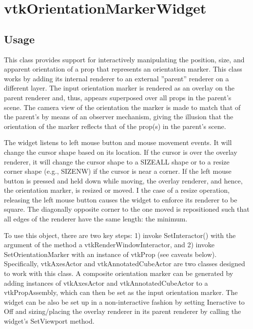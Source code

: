 \section{vtkOrientationMarkerWidget}

\subsection{Usage}

 This class provides support for interactively manipulating the position,
 size, and apparent orientation of a prop that represents an orientation
 marker.  This class works by adding its internal renderer to an external
 ''parent'' renderer on a different layer.  The input orientation marker is
 rendered as an overlay on the parent renderer and, thus, appears superposed
 over all props in the parent's scene.  The camera view of the orientation
 the marker is made to match that of the parent's by means of an observer
 mechanism, giving the illusion that the orientation of the marker reflects
 that of the prop(s) in the parent's scene.

 The widget listens to left mouse button and mouse movement events. It will
 change the cursor shape based on its location. If the cursor is over the
 overlay renderer, it will change the cursor shape to a SIZEALL shape
 or to a resize corner shape (e.g., SIZENW) if the cursor is near a corner.
 If the left mouse button is pressed and held down while moving, the overlay
 renderer, and hence, the orientation marker, is resized or moved.  I the case
 of a resize operation, releasing the left mouse button causes the widget
 to enforce its renderer to be square.  The diagonally opposite corner to the
 one moved is repositioned such that all edges of the renderer have the same
 length: the minimum.

 To use this object, there are two key steps: 1) invoke SetInteractor() with
 the argument of the method a vtkRenderWindowInteractor, and 2) invoke
 SetOrientationMarker with an instance of vtkProp (see caveats below).
 Specifically, vtkAxesActor and vtkAnnotatedCubeActor are two classes
 designed to work with this class.  A composite orientation marker can be
 generated by adding instances of vtkAxesActor and vtkAnnotatedCubeActor to a
 vtkPropAssembly, which can then be set as the input orientation marker.
 The widget can be also be set up in a non-interactive fashion by setting 
 Ineractive to Off and sizing/placing the overlay renderer in its parent 
 renderer by calling the widget's SetViewport method.

